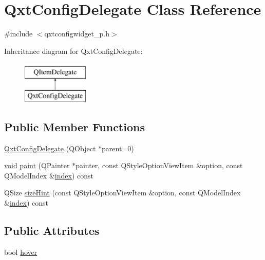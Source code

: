 \hypertarget{class_qxt_config_delegate}{\section{Qxt\-Config\-Delegate Class Reference}
\label{class_qxt_config_delegate}
}


{\ttfamily \#include $<$qxtconfigwidget\-\_\-p.\-h$>$}

Inheritance diagram for Qxt\-Config\-Delegate\-:\begin{figure}[H]
\begin{center}
\leavevmode
\includegraphics[height=2.000000cm]{class_qxt_config_delegate}
\end{center}
\end{figure}
\subsection*{Public Member Functions}
\begin{DoxyCompactItemize}
\item 
\hyperlink{class_qxt_config_delegate_ad59aa2dee0408a8bff23d81e1a270a9b}{Qxt\-Config\-Delegate} (Q\-Object $\ast$parent=0)
\item 
\hyperlink{group___u_a_v_objects_plugin_ga444cf2ff3f0ecbe028adce838d373f5c}{void} \hyperlink{class_qxt_config_delegate_aa6f0d4c0eaed32470548a60bc60b6b39}{paint} (Q\-Painter $\ast$painter, const Q\-Style\-Option\-View\-Item \&option, const Q\-Model\-Index \&\hyperlink{glext_8h_ab47dd9958bcadea08866b42bf358e95e}{index}) const 
\item 
Q\-Size \hyperlink{class_qxt_config_delegate_a0848eb284d433f8e4965240ab821f4b1}{size\-Hint} (const Q\-Style\-Option\-View\-Item \&option, const Q\-Model\-Index \&\hyperlink{glext_8h_ab47dd9958bcadea08866b42bf358e95e}{index}) const 
\end{DoxyCompactItemize}
\subsection*{Public Attributes}
\begin{DoxyCompactItemize}
\item 
bool \hyperlink{class_qxt_config_delegate_a293707d71cf476bb39e2eb69a9771eb0}{hover}
\end{DoxyCompactItemize}


